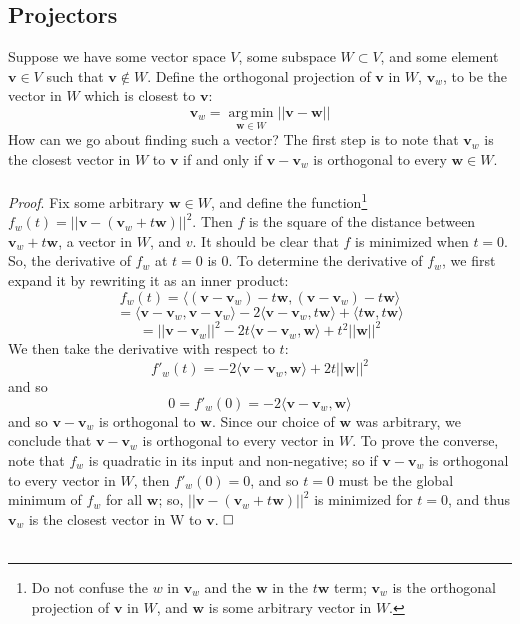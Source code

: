 \documentclass{article}
\newcommand{\la}{\langle}
\newcommand{\ra}{\rangle}
\newcommand{\tit}{\textit}
\DeclareMathOperator*{\argmin}{arg\,min}
\begin{document}
\subsection{Projectors}
Suppose we have some vector space $V$, some subspace $W \subset V$, and some element $\mathbf{v} \in V$ such that $\mathbf{v} \notin W$. Define the orthogonal projection of $\mathbf{v}$ in $W$, $\mathbf{v}_w$, to be the vector in $W$ which is closest to $\mathbf{v}$: $$\mathbf{v}_w = \argmin\limits_{\mathbf{w} \in W} ||\mathbf{v} - \mathbf{w}||$$ How can we go about finding such a vector? The first step is to note that $\mathbf{v}_w$ is the closest vector in $W$ to $\mathbf{v}$ if and only if $\mathbf{v} - \mathbf{v}_w$ is orthogonal to every $\mathbf{w} \in W$. \\\\
\tit{Proof}. Fix some arbitrary $\mathbf{w} \in W$, and define the function\footnote{Do not confuse the $w$ in $\mathbf{v}_w$ and the $\mathbf{w}$ in the $t\mathbf{w}$ term; $\mathbf{v}_w$ is the orthogonal projection of $\mathbf{v}$ in $W$, and $\mathbf{w}$ is some arbitrary vector in $W$.} $f_w(t) = ||\mathbf{v} - (\mathbf{v}_w + t\mathbf{w})||^2$. Then $f$ is the square of the distance between $\mathbf{v}_w + t\mathbf{w}$, a vector in $W$, and $v$. It should be clear that $f$ is minimized when $t = 0$. So, the derivative of $f_w$ at $t = 0$ is 0. To determine the derivative of $f_w$, we first expand it by rewriting it as an inner product: $$f_w(t) = \la (\mathbf{v} - \mathbf{v}_w) - t\mathbf{w}, (\mathbf{v} - \mathbf{v}_w) - t\mathbf{w} \ra$$ $$= \la \mathbf{v} - \mathbf{v}_w, \mathbf{v} - \mathbf{v}_w \ra - 2\la \mathbf{v} - \mathbf{v}_w, t\mathbf{w} \ra + \la t\mathbf{w}, t\mathbf{w}\ra $$ $$= ||\mathbf{v} - \mathbf{v}_w||^2 - 2t\la \mathbf{v} - \mathbf{v}_w, \mathbf{w}\ra + t^2||\mathbf{w}||^2$$ We then take the derivative with respect to $t$: $$f'_w(t) = -2\la \mathbf{v} - \mathbf{v}_w, \mathbf{w}\ra + 2t||\mathbf{w}||^2$$ and so $$0 = f'_w(0) = -2\la \mathbf{v} - \mathbf{v}_w, \mathbf{w} \ra$$ and so $\mathbf{v} - \mathbf{v}_w$ is orthogonal to $\mathbf{w}$. Since our choice of $\mathbf{w}$ was arbitrary, we conclude that $\mathbf{v} - \mathbf{v}_w$ is orthogonal to every vector in $W$. To prove the converse, note that $f_w$ is quadratic in its input and non-negative; so if $\mathbf{v} - \mathbf{v}_w$ is orthogonal to every vector in $W$, then $f'_w(0) = 0$, and so $t = 0$ must be the global minimum of $f_w$ for all $\mathbf{w}$; so, $||\mathbf{v} - (\mathbf{v}_w + t\mathbf{w})||^2$ is minimized for $t = 0$, and thus $\mathbf{v}_w$ is the closest vector in W to $\mathbf{v}$. $\hfill\square$ \\\\
\end{document}
